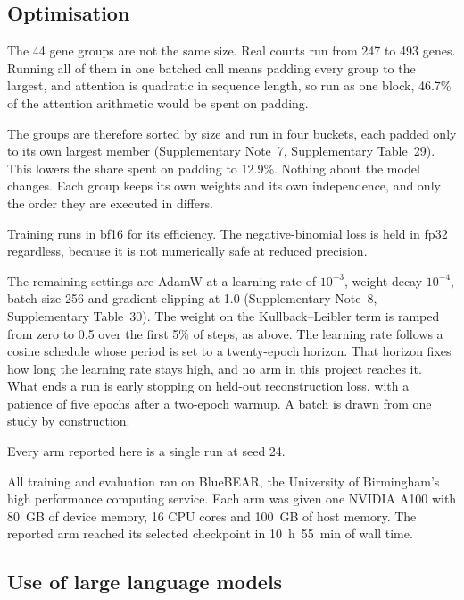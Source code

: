 \subsection*{Optimisation}

The 44 gene groups are not the same size. Real counts run from 247 to 493
genes. Running all of them in one batched call means padding every group to
the largest, and attention is quadratic in sequence length, so run as one
block, 46.7\% of the attention arithmetic would be spent on padding.

The groups are therefore sorted by size and run in four buckets, each padded
only to its own largest member (Supplementary Note~7, Supplementary Table~29). This lowers the share spent on padding to
12.9\%. Nothing about the model changes. Each
group keeps its own weights and its own independence, and only the order they
are executed in differs.

Training runs in bf16 for its efficiency. The negative-binomial loss is held
in fp32 regardless, because it is not numerically safe at reduced precision.

The remaining settings are AdamW \citep{loshchilov2019decoupled} at a learning rate of $10^{-3}$, weight decay
$10^{-4}$, batch size 256 and gradient clipping at 1.0 (Supplementary Note~8, Supplementary Table~30). The weight on the
Kullback--Leibler term is ramped from zero to 0.5 over the first 5\% of
steps, as above. The learning rate follows a cosine schedule whose period is set
to a twenty-epoch horizon. That horizon fixes how long the learning rate stays 
high, and no arm in this project reaches it. What ends a run is early stopping 
on held-out reconstruction loss, with a patience of five epochs after a 
two-epoch warmup. A batch is drawn from one study by construction.

Every arm reported here is a single run at seed 24.

All training and evaluation ran on BlueBEAR, the University of Birmingham's
high performance computing service. Each arm was given one NVIDIA A100 with
80~GB of device memory, 16 CPU cores and 100~GB of host memory. The reported
arm reached its selected checkpoint in 10~h~55~min of wall time.



\subsection*{Use of large language models}


